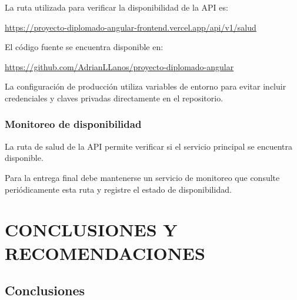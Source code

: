 La ruta utilizada para verificar la disponibilidad de la API es:

\begin{center}
	
	\url{
		https://proyecto-diplomado-angular-frontend.vercel.app/api/v1/salud
	}
	
\end{center}

El código fuente se encuentra disponible en:

\begin{center}
	
	\url{
		https://github.com/AdrianLLanos/proyecto-diplomado-angular
	}
	
\end{center}

La configuración de producción utiliza variables de entorno para evitar
incluir credenciales y claves privadas directamente en el repositorio.



\subsection{Monitoreo de disponibilidad}

La ruta de salud de la API permite verificar si el servicio principal se
encuentra disponible.

Para la entrega final debe mantenerse un servicio de monitoreo que consulte
periódicamente esta ruta y registre el estado de disponibilidad.

%
%



\chapter{CONCLUSIONES Y RECOMENDACIONES}



\section{Conclusiones}

